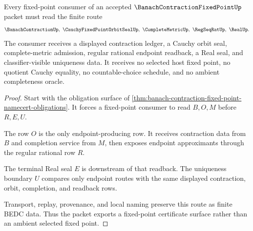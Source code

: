 \begin{theorem}
\label{thm:banach-contraction-fixed-point-handoff}
Every fixed-point consumer of an accepted $\BanachContractionFixedPointUp$ packet must read the finite route
$$
\BanachContractionUp,\ \CauchyFixedPointOrbitSealUp,\ \CompleteMetricUp,\ \RegSeqRatUp,\ \RealUp .
$$
The consumer receives a displayed contraction ledger, a Cauchy orbit seal, complete-metric admission, regular rational endpoint readback, a Real seal, and classifier-visible uniqueness data. It receives no selected host fixed point, no quotient Cauchy equality, no countable-choice schedule, and no ambient completeness oracle.
\end{theorem}
\begin{proof}
Start with the obligation surface of \autoref{thm:banach-contraction-fixed-point-namecert-obligations}. It forces a fixed-point consumer to read $B,O,M$ before $R,E,U$.

The row $O$ is the only endpoint-producing row. It receives contraction data from $B$ and completion service from $M$, then exposes endpoint approximants through the regular rational row $R$.

The terminal Real seal $E$ is downstream of that readback. The uniqueness boundary $U$ compares only endpoint routes with the same displayed contraction, orbit, completion, and readback rows.

Transport, replay, provenance, and local naming preserve this route as finite BEDC data. Thus the packet exports a fixed-point certificate surface rather than an ambient selected fixed point.
\end{proof}



